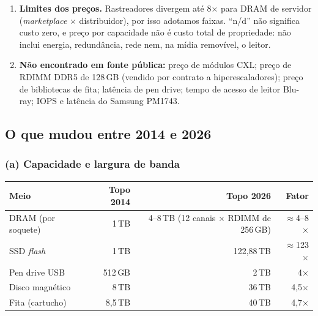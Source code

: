 \documentclass[11pt,a4paper]{article}
\begin{document}
{\begin{enumerate}[label=\textbf{N\arabic*.},leftmargin=*]
      300\,MB/s no LTO-9). Valores ``comprimidos'' supõem 2,5:1, razão não atingida por
      dados já comprimidos ou cifrados. A biblioteca é derivação nossa: 128 \emph{drives}
      $\times$ 400\,MB/s $=$ 51,2\,GB/s (teto teórico) e 23.170 cartuchos $\times$ 40\,TB
      $=$ 926,8\,PB; IBM e Quantum não publicam esses totais nem preços.
\item \textbf{Limites dos preços.} Rastreadores divergem até 8$\times$ para DRAM de servidor
      (\emph{marketplace} $\times$ distribuidor), por isso adotamos faixas. ``n/d'' não
      significa custo zero, e preço por capacidade não é custo total de propriedade: não
      inclui energia, redundância, rede nem, na mídia removível, o leitor.
\item \textbf{Não encontrado em fonte pública:} preço de módulos CXL; preço de RDIMM DDR5 de
      128\,GB (vendido por contrato a hiperescaladores); preço de bibliotecas de fita;
      latência de pen drive; tempo de acesso de leitor Blu-ray; IOPS e latência do Samsung
      PM1743.
\end{enumerate}
}

\subsection{O que mudou entre 2014 e 2026}

\subsubsection*{(a) Capacidade e largura de banda}

\begin{center}\small
\begin{tabular}{@{}lrrr@{}}
\toprule
\textbf{Meio} & \textbf{Topo 2014} & \textbf{Topo 2026} & \textbf{Fator} \\
\midrule
DRAM (por soquete)    & 1\,TB            & 4--8\,TB (12 canais $\times$ RDIMM de 256\,GB) & $\approx$4--8$\times$ \\
SSD \emph{flash}      & 1\,TB            & 122,88\,TB                          & $\approx$123$\times$ \\
Pen drive USB         & 512\,GB          & 2\,TB                               & 4$\times$ \\
Disco magnético       & 8\,TB            & 36\,TB                              & 4,5$\times$ \\
Fita (cartucho)       & 8,5\,TB          & 40\,TB                              & 4,7$\times$ \\
\bottomrule
\end{tabular}
\end{center}
\end{document}
